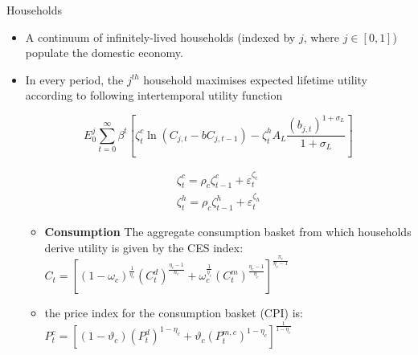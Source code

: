 \documentclass[9pt]{beamer}
\let\olditem\item
\renewcommand{\item}{%
\olditem\vspace{\fill}}
\begin{document}
\begin{frame}{Households}
\begin{itemize}
    \item A continuum of infinitely-lived households (indexed by $j$, where $j \in [0,1]$) populate the domestic economy. 
    
    \item In every period, the $j^{th}$ household maximises expected lifetime utility according to following intertemporal utility
    function
    
    $$E_{0}^{j} \sum_{t=0}^{\infty} \beta^{t}\left[\zeta_{t}^{c} \ln \left(C_{j, t}-b C_{j, t-1}\right)-\zeta_{t}^{h} A_{L} \frac{\left(b_{j, t}\right)^{1+\sigma_{L}}}{1+\sigma_{L}}\right]$$
    
    $$\begin{array}{l}
\zeta_{t}^{c}=\rho_{c} \zeta_{t-1}^{c}+\varepsilon_{t}^{\zeta_c} \\
\zeta_{t}^{h}=\rho_{c} \zeta_{t-1}^{h}+\varepsilon_{t}^{\zeta_h}
\end{array}$$    

    \begin{itemize}
        \item \textbf{Consumption} The aggregate consumption basket from which households derive utility is given by the CES index: $C_{t}=\left[\left(1-\omega_{c}\right)^{\frac{1}{\eta_{c}}}\left(C_{t}^{d}\right)^{\frac{\eta_{c}-1}{n_{c}}}+\omega_{c}^{\frac{1}{\eta_{c}}}\left(C_{t}^{m}\right)^{\frac{\eta_{c}-1}{\eta_{c}}}\right]^{\frac{\pi_{c}}{\eta_{c}-1}}$
        
    \item the price index for the consumption basket (CPI) is: $P_{t}^{c}=\left[\left(1-\vartheta_{c}\right)\left(P_{t}^{d}\right)^{1-\eta_{c}}+\vartheta_{c}\left(P_{t}^{m, c}\right)^{1-\eta_{c}}\right]^{\frac{1}{1-\eta_{c}}}$
        
        
    \end{itemize}
    

\end{itemize}

\end{frame}
\end{document}

